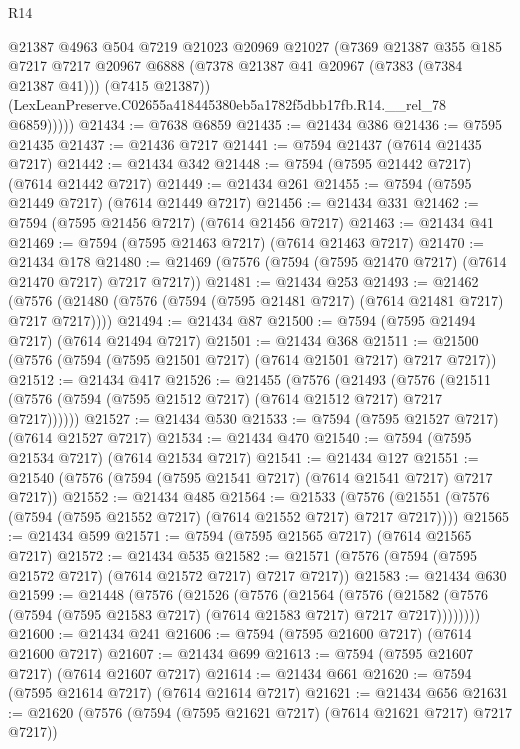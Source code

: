 \begin{lexlean}{R14}
\begin{coremodule}
            @21387
            @4963
            @504
            @7219
            @21023
            @20969
            @21027
            (@7369
              @21387
              @355
              @185
              @7217
              @7217
              @20967
              @6888
              (@7378 @21387 @41 @20967 (@7383 (@7384 @21387 @41)))
              (@7415 @21387))
            (LexLeanPreserve.C02655a418445380eb5a1782f5dbb17fb.R14.__rel_78 @6859)))))
@21434 := @7638 @6859
@21435 := @21434 @386
@21436 := @7595 @21435
@21437 := @21436 @7217
@21441 := @7594 @21437 (@7614 @21435 @7217)
@21442 := @21434 @342
@21448 := @7594 (@7595 @21442 @7217) (@7614 @21442 @7217)
@21449 := @21434 @261
@21455 := @7594 (@7595 @21449 @7217) (@7614 @21449 @7217)
@21456 := @21434 @331
@21462 := @7594 (@7595 @21456 @7217) (@7614 @21456 @7217)
@21463 := @21434 @41
@21469 := @7594 (@7595 @21463 @7217) (@7614 @21463 @7217)
@21470 := @21434 @178
@21480 := @21469 (@7576 (@7594 (@7595 @21470 @7217) (@7614 @21470 @7217) @7217 @7217))
@21481 := @21434 @253
@21493 := @21462
    (@7576 (@21480 (@7576 (@7594 (@7595 @21481 @7217) (@7614 @21481 @7217) @7217 @7217))))
@21494 := @21434 @87
@21500 := @7594 (@7595 @21494 @7217) (@7614 @21494 @7217)
@21501 := @21434 @368
@21511 := @21500 (@7576 (@7594 (@7595 @21501 @7217) (@7614 @21501 @7217) @7217 @7217))
@21512 := @21434 @417
@21526 := @21455
    (@7576
      (@21493
        (@7576 (@21511 (@7576 (@7594 (@7595 @21512 @7217) (@7614 @21512 @7217) @7217 @7217))))))
@21527 := @21434 @530
@21533 := @7594 (@7595 @21527 @7217) (@7614 @21527 @7217)
@21534 := @21434 @470
@21540 := @7594 (@7595 @21534 @7217) (@7614 @21534 @7217)
@21541 := @21434 @127
@21551 := @21540 (@7576 (@7594 (@7595 @21541 @7217) (@7614 @21541 @7217) @7217 @7217))
@21552 := @21434 @485
@21564 := @21533
    (@7576 (@21551 (@7576 (@7594 (@7595 @21552 @7217) (@7614 @21552 @7217) @7217 @7217))))
@21565 := @21434 @599
@21571 := @7594 (@7595 @21565 @7217) (@7614 @21565 @7217)
@21572 := @21434 @535
@21582 := @21571 (@7576 (@7594 (@7595 @21572 @7217) (@7614 @21572 @7217) @7217 @7217))
@21583 := @21434 @630
@21599 := @21448
    (@7576
      (@21526
        (@7576
          (@21564
            (@7576
              (@21582 (@7576 (@7594 (@7595 @21583 @7217) (@7614 @21583 @7217) @7217 @7217))))))))
@21600 := @21434 @241
@21606 := @7594 (@7595 @21600 @7217) (@7614 @21600 @7217)
@21607 := @21434 @699
@21613 := @7594 (@7595 @21607 @7217) (@7614 @21607 @7217)
@21614 := @21434 @661
@21620 := @7594 (@7595 @21614 @7217) (@7614 @21614 @7217)
@21621 := @21434 @656
@21631 := @21620 (@7576 (@7594 (@7595 @21621 @7217) (@7614 @21621 @7217) @7217 @7217))

\end{coremodule}
\end{lexlean}
